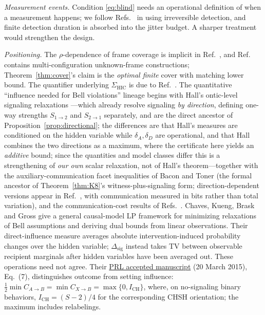 \documentclass[10pt,twocolumn]{article}
\newcommand{\Sig}{\Sigma_{\mathrm{HIC}}}
\newcommand{\Dsig}{\Delta_{\mathrm{sig}}}
\begin{document}
\emph{Measurement events.} Condition \eqref{eq:blind} needs an operational definition of when a measurement happens; we follow Refs.~\cite{Salart2008,Zbinden2001} in using irreversible detection, and finite detection duration is absorbed into the jitter budget. A sharper treatment would strengthen the design.

\emph{Positioning.} The $\rho$-dependence of frame coverage is implicit in Ref.~\cite{Salart2008}, and Ref.~\cite{Bancal2012} contains multi-configuration unknown-frame constructions; Theorem~\ref{thm:cover}'s claim is the \emph{optimal finite} cover with matching lower bound. The quantifier underlying $\Sig$ is due to Ref.~\cite{Brito2018}. The quantitative ``influence needed for Bell violations'' lineage begins with Hall's ontic-level signaling relaxations \cite{Hall2010}---which already resolve signaling \emph{by direction}, defining one-way strengths $S_{1\to2}$ and $S_{2\to1}$ separately, and are the direct ancestor of Proposition~\ref{prop:directional}; the differences are that Hall's measures are conditioned on the hidden variable while $\delta_A,\delta_D$ are operational, and that Hall combines the two directions as a maximum, where the certificate here yields an \emph{additive} bound; since the quantities and model classes differ this is a strengthening of \emph{our own} scalar relaxation, not of Hall's theorem---together with the auxiliary-communication facet inequalities of Bacon and Toner \cite{BaconToner2003} (the formal ancestor of Theorem~\ref{thm:K8}'s witness-plus-signaling form; direction-dependent versions appear in Ref.~\cite{MaxwellChitambar2014}, with communication measured in bits rather than total variation), and the communication-cost results of Refs.~\cite{Pironio2003,TonerBacon2003}. Chaves, Kueng, Brask and Gross \cite{Chaves2015} give a general causal-model
LP framework for minimizing relaxations of Bell assumptions and deriving dual
bounds from linear observations. Their direct-influence measure averages
absolute intervention-induced probability changes over the hidden variable;
$\Dsig$ instead takes TV between observable recipient marginals after hidden
variables have been averaged out. These operations need not agree. Their
\href{https://link.aps.org/accepted/10.1103/PhysRevLett.114.140403}{PRL accepted manuscript}
(20 March 2015), Eq.~(7), distinguishes outcome from setting influence:
$\tfrac12\min C_{A\to B}=\min C_{X\to B}=\max\{0,I_{\mathrm{CH}}\}$,
where, on no-signaling binary behaviors, $I_{\mathrm{CH}}=(S-2)/4$ for the
corresponding CHSH orientation; the maximum includes relabelings.
\end{document}
